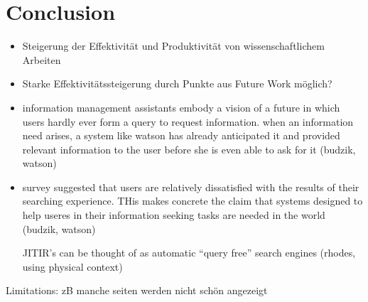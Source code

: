 \section{Conclusion}
 \begin{itemize}
 		\item Steigerung der Effektivität und Produktivität von wissenschaftlichem Arbeiten
 		\item Starke Effektivitätssteigerung durch Punkte aus Future Work möglich?
 		\item information management assistants embody a vision of a future in which users hardly ever form a query to request information. when an information need arises, a system like watson has already anticipated it and provided relevant information to the user before she is even able to ask for it (budzik, watson)
 		\item survey suggested that users are relatively dissatisfied with the results of their searching experience. THis makes concrete the claim that systems designed to help useres in their information seeking tasks are needed in the world (budzik, watson)

 		JITIR's can be thought of as automatic ``query free'' search engines (rhodes, using physical context)
 	\end{itemize}

 	Limitations: zB manche seiten werden nicht schön angezeigt